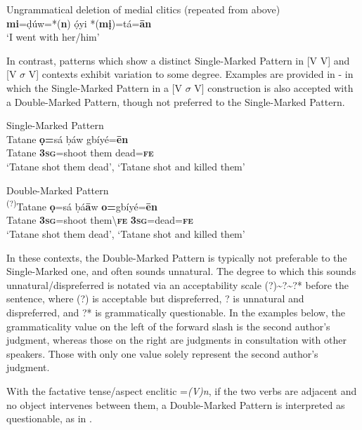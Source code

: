 \documentclass[output=paper]{langsci/langscibook}
\begin{document}
\ea
{Ungrammatical deletion of medial clitics (repeated from  above)}\\
\textbf{mi}=ḍúw=*(\textbf{n})   ọ́yi   *(\textbf{mị})=tá=\textbf{ān}\\
\glt ‘I went with her/him’ \citep[201]{Kari2004}
\z

In contrast, patterns which show a distinct Single-Marked Pattern in [V V] and [V $\sigma $ V] contexts exhibit variation to some degree. Examples are provided in - in which the Single-Marked Pattern in a [V $\sigma $ V] construction is also accepted with a Double-Marked Pattern, though not preferred to the Single-Marked Pattern.

\ea\label{ex:rolle:21}
Single-Marked Pattern\\
\gll    Tatane  \textbf{ọ=}sá    ḅáw   gbíyé=\textbf{ēn}\\
     Tatane  \textbf{3}\textbf{\textsc{sg}}=shoot  them   dead=\textbf{\textsc{fe}}\\
\glt ‘Tatane shot them dead’, ‘Tatane shot and killed them’ 
\z

\ea\label{ex:rolle:22}
 Double-Marked Pattern\\
\gll  \textsuperscript{(?)}Tatane  \textbf{ọ}=sá    ḅá\textbf{ā}w    \textbf{o=}gbíyé=\textbf{ēn}\\
     Tatane  \textbf{3\textsc{sg}}=shoot   them{\textbackslash}\textbf{\textsc{fe}}    \textbf{3\textsc{sg}}=dead=\textbf{\textsc{fe}}\\
\glt ‘Tatane shot them dead’, ‘Tatane shot and killed them’
\z

In these contexts, the Double-Marked Pattern is typically not preferable to the Single-Marked one, and often sounds unnatural. The degree to which this sounds unnatural/dispreferred is notated via an acceptability scale (?){\textasciitilde}?{\textasciitilde}?* before the sentence, where (?) is acceptable but dispreferred, ? is unnatural and dispreferred, and ?* is grammatically questionable. In the examples below, the grammaticality value on the left of the forward slash is the second author’s judgment, whereas those on the right are judgments in consultation with other  speakers. Those with only one value solely represent the second author’s judgment.

With the factative tense/aspect enclitic =\textit{(V)n}, if the two verbs are adjacent and no object intervenes between them, a Double-Marked Pattern is interpreted as questionable, as in . 
\end{document}
